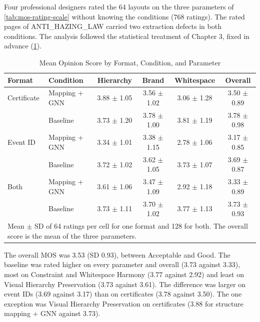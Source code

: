\begin{refsection}
Four professional designers rated the 64 layouts on the three parameters of \ref{tab:mos-rating-scale} without knowing the conditions (768 ratings). The rated pages of ANTI\_HAZING\_LAW carried two extraction defects in both conditions. The analysis followed the statistical treatment of Chapter 3, fixed in advance (\ref{tab:mos}).

\begin{table}[!ht]
\centering
\caption{Mean Opinion Score by Format, Condition, and Parameter}
\label{tab:mos}
\setlength{\tabcolsep}{4pt}
\begin{tabular}{l l c c c c}
\hline
\textbf{Format} & \textbf{Condition} & \textbf{Hierarchy} & \textbf{Brand} & \textbf{Whitespace} & \textbf{Overall} \\ \hline
Certificate & Mapping + GNN & 3.88 $\pm$ 1.05 & 3.56 $\pm$ 1.02 & 3.06 $\pm$ 1.28 & 3.50 $\pm$ 0.89 \\
 & Baseline & 3.73 $\pm$ 1.20 & 3.78 $\pm$ 1.00 & 3.81 $\pm$ 1.19 & 3.78 $\pm$ 0.98 \\ \hline
Event ID & Mapping + GNN & 3.34 $\pm$ 1.01 & 3.38 $\pm$ 1.15 & 2.78 $\pm$ 1.06 & 3.17 $\pm$ 0.85 \\
 & Baseline & 3.72 $\pm$ 1.02 & 3.62 $\pm$ 1.05 & 3.73 $\pm$ 1.07 & 3.69 $\pm$ 0.87 \\ \hline
Both & Mapping + GNN & 3.61 $\pm$ 1.06 & 3.47 $\pm$ 1.09 & 2.92 $\pm$ 1.18 & 3.33 $\pm$ 0.89 \\
 & Baseline & 3.73 $\pm$ 1.11 & 3.70 $\pm$ 1.02 & 3.77 $\pm$ 1.13 & 3.73 $\pm$ 0.93 \\ \hline
\multicolumn{6}{p{0.92\textwidth}}{\footnotesize Mean $\pm$ SD of 64 ratings per cell for one format and 128 for both. The overall score is the mean of the three parameters.}
\end{tabular}
\end{table}

The overall MOS was 3.53 (SD 0.93), between Acceptable and Good. The baseline was rated higher on every parameter and overall (3.73 against 3.33), most on Constraint and Whitespace Harmony (3.77 against 2.92) and least on Visual Hierarchy Preservation (3.73 against 3.61). The difference was larger on event IDs (3.69 against 3.17) than on certificates (3.78 against 3.50). The one exception was Visual Hierarchy Preservation on certificates (3.88 for structure mapping + GNN against 3.73).


\end{refsection}
